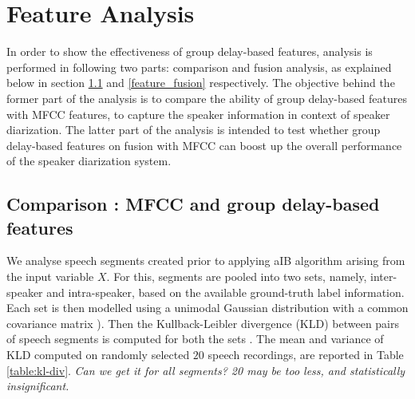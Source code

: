 \documentclass[conference]{IEEEtran}
\begin{document}

\section{Feature Analysis}
\label{feature_analysis_and_fusion}
In order to show the effectiveness of group delay-based features, analysis is
performed in following two parts: comparison and fusion analysis, as explained
below in section \ref{feature_analysis} and \ref{feature_fusion} respectively.
The objective behind the former part of the analysis is to compare the ability
of group delay-based features with MFCC features, to capture the speaker
information in context of speaker diarization. The latter part of the
analysis is intended to test whether group delay-based features on fusion with
MFCC can boost up the overall performance of the speaker diarization system. 
 
\subsection{Comparison : MFCC and group delay-based features}
\label{feature_analysis}

We analyse speech segments created prior to applying aIB algorithm arising from
the input variable $X$.  For this, segments are pooled into two sets, 
namely, inter-speaker and intra-speaker, based on the available ground-truth 
label information. Each set is then modelled using a unimodal Gaussian
distribution with a common covariance matrix \cite{featFilterBank}). 
Then the Kullback-Leibler divergence (KLD) between pairs of 
speech segments is computed for both the
sets \cite{kld}. The mean and variance of KLD computed on randomly selected $20$
speech recordings, are reported in Table \ref{table:kl-div}. 
\textit{Can we get it for all segments? 20 may be too less, and statistically
insignificant.}
\end{document}
